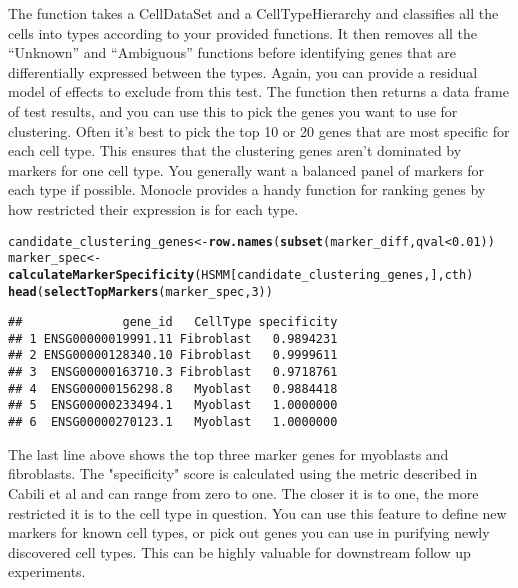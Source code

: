 \documentclass[10pt,oneside]{article}\usepackage[]{graphicx}\usepackage[]{color}
\makeatletter
\newcommand{\hlnum}[1]{\textcolor[rgb]{0.686,0.059,0.569}{#1}}%
\newcommand{\hlopt}[1]{\textcolor[rgb]{0,0,0}{#1}}%
\newcommand{\hlstd}[1]{\textcolor[rgb]{0.345,0.345,0.345}{#1}}%
\newcommand{\hlkwb}[1]{\textcolor[rgb]{0.69,0.353,0.396}{#1}}%
\newcommand{\hlkwd}[1]{\textcolor[rgb]{0.737,0.353,0.396}{\textbf{#1}}}%
\newenvironment{kframe}{%
 \def\at@end@of@kframe{}%
 \ifinner\ifhmode%
  \def\at@end@of@kframe{\end{minipage}}%
  \begin{minipage}{\columnwidth}%
 \fi\fi%
 \def\FrameCommand##1{\hskip\@totalleftmargin \hskip-\fboxsep
 \colorbox{shadecolor}{##1}\hskip-\fboxsep
     \hskip-\linewidth \hskip-\@totalleftmargin \hskip\columnwidth}%
 \MakeFramed {\advance\hsize-\width
   \@totalleftmargin\z@ \linewidth\hsize
   \@setminipage}}%
 {\par\unskip\endMakeFramed%
 \at@end@of@kframe}
\newenvironment{knitrout}{}{} %
\makeatother
\begin{document}
The function  takes a CellDataSet and a CellTypeHierarchy and classifies all the cells into types according to your provided functions. It then removes all the ``Unknown'' and ``Ambiguous'' functions before identifying genes that are differentially expressed between the types. Again, you can provide a residual model of effects to exclude from this test. The function then returns a data frame of test results, and you can use this to pick the genes you want to use for clustering. Often it's best to pick the top 10 or 20 genes that are most specific for each cell type. This ensures that the clustering genes aren't dominated by markers for one cell type. You generally want a balanced panel of markers for each type if possible. Monocle provides a handy function for ranking genes by how restricted their expression is for each type.  


\begin{knitrout}
\color{fgcolor}\begin{kframe}
\begin{alltt}
\hlstd{candidate_clustering_genes} \hlkwb{<-} \hlkwd{row.names}\hlstd{(}\hlkwd{subset}\hlstd{(marker_diff, qval} \hlopt{<} \hlnum{0.01}\hlstd{))}
\hlstd{marker_spec} \hlkwb{<-} \hlkwd{calculateMarkerSpecificity}\hlstd{(HSMM[candidate_clustering_genes,], cth)}
\hlkwd{head}\hlstd{(}\hlkwd{selectTopMarkers}\hlstd{(marker_spec,} \hlnum{3}\hlstd{))}
\end{alltt}
\begin{verbatim}
##              gene_id   CellType specificity
## 1 ENSG00000019991.11 Fibroblast   0.9894231
## 2 ENSG00000128340.10 Fibroblast   0.9999611
## 3  ENSG00000163710.3 Fibroblast   0.9718761
## 4  ENSG00000156298.8   Myoblast   0.9884418
## 5  ENSG00000233494.1   Myoblast   1.0000000
## 6  ENSG00000270123.1   Myoblast   1.0000000
\end{verbatim}
\end{kframe}
\end{knitrout}
The last line above shows the top three marker genes for myoblasts and fibroblasts. The "specificity" score is calculated using the metric described in Cabili et al \cite{CABILI} and can range from zero to one. The closer it is to one, the more restricted it is to the cell type in question. You can use this feature to define new markers for known cell types, or pick out genes you can use in purifying newly discovered cell types. This can be highly valuable for downstream follow up experiments.
\end{document}
